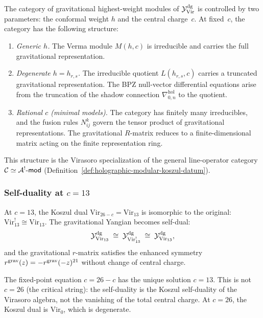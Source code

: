 \begin{remark}
\label{rem:thqg-V-gravitational-rep-category}
The category of gravitational highest-weight modules of
$\mathcal{Y}^{\mathrm{dg}}_{\mathrm{Vir}}$ is controlled by two parameters: the
conformal weight $h$ and the central charge~$c$. At fixed~$c$,
the category has the following structure:
\begin{enumerate}[label=\textup{(\roman*)}]
\item \emph{Generic $h$.}
 The Verma module $M(h,c)$ is irreducible and carries the full
 gravitational representation.
\item \emph{Degenerate $h = h_{r,s}$.}
 The irreducible quotient $L(h_{r,s},c)$ carries a truncated
 gravitational representation. The BPZ null-vector differential
 equations arise from the truncation of the shadow connection
 $\nabla^{\mathrm{hol}}_{0,n}$ to the quotient.
\item \emph{Rational $c$ (minimal models).}
 The category has finitely many irreducibles, and the fusion rules
 $N_{ij}^k$ govern the tensor product of gravitational
 representations. The gravitational $R$-matrix reduces to a
 finite-dimensional matrix acting on the finite representation ring.
\end{enumerate}
This structure is the Virasoro specialization of the general
line-operator category $\mathcal{C} \simeq \mathcal{A}^!\text{-}\mathsf{mod}$
(Definition~\ref{def:holographic-modular-koszul-datum}).
\end{remark}


\subsubsection{Self-duality at $c = 13$}

\begin{proposition}[Self-duality of the gravitational Yangian at
$c = 13$; \ClaimStatusProvedHere]
\label{prop:thqg-V-c13-self-duality}
At $c = 13$, the Koszul dual $\mathrm{Vir}_{26-c} = \mathrm{Vir}_{13}$
is isomorphic to the original: $\mathrm{Vir}_{13}^! \cong
\mathrm{Vir}_{13}$. The gravitational Yangian becomes self-dual:
\begin{equation}\label{eq:thqg-V-c13-self-dual}
\mathcal{Y}^{\mathrm{dg}}_{\mathrm{Vir}_{13}}
\;\cong\;
\mathcal{Y}^{\mathrm{dg}}_{\mathrm{Vir}_{13}^!}
\;\cong\;
\mathcal{Y}^{\mathrm{dg}}_{\mathrm{Vir}_{13}},
\end{equation}
and the gravitational $r$-matrix satisfies the enhanced symmetry
$r^{\mathrm{grav}}(z) = -r^{\mathrm{grav}}(-z)^{21}$ without change of central charge.

The fixed-point equation $c = 26 - c$ has the unique solution
$c = 13$. This is not $c = 26$ (the critical string): the
self-duality is the Koszul self-duality of the Virasoro algebra,
not the vanishing of the total central charge. At $c = 26$, the
Koszul dual is $\mathrm{Vir}_0$, which is degenerate.
\end{proposition}

